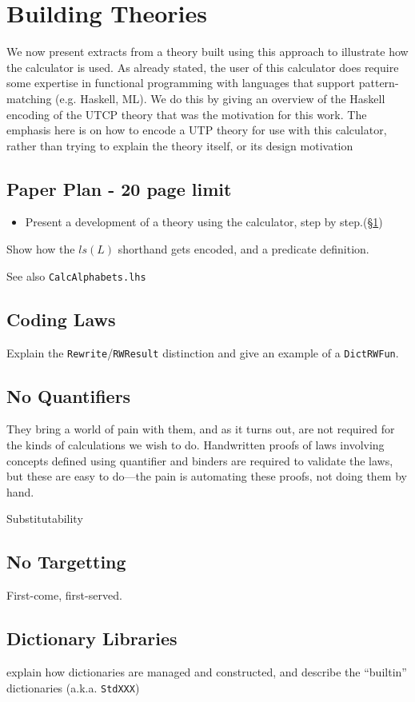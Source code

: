 \section{Building Theories}\label{sec:Theorising}


We now present extracts from a theory built using this
approach to illustrate how the calculator is used.
As already stated,
the user of this calculator does require some expertise
in functional programming with languages that support
pattern-matching (e.g. Haskell, ML).
We do this by giving an overview of the Haskell encoding
of the UTCP theory
that was the motivation for this work.
The emphasis here is on how to encode a UTP theory for use with this
calculator,
rather than trying to explain the theory itself, or its design motivation



\subsection*{Paper Plan - 20 page limit}

\begin{itemize}
  \item
     Present a development of a theory using the calculator,
     step by step.(\S\ref{sec:Theorising})
\end{itemize}

Show how the $ls(L)$ shorthand gets encoded,
and a predicate definition.

See also \texttt{CalcAlphabets.lhs}

\subsection{Coding Laws}\label{ssec:coding-laws}

Explain the \texttt{Rewrite}/\texttt{RWResult} distinction
and give an example of a \texttt{DictRWFun}.

\subsection{No Quantifiers}\label{ssec:no-quant}

    They bring a world of pain with them,
    and as it turns out, are not required
    for the kinds of calculations we wish to do.
    Handwritten proofs of laws involving concepts
    defined using quantifier and binders
    are required to validate the laws,
    but these are easy to do---the pain is automating these proofs,
    not doing them by hand.

    Substitutability

\subsection{No Targetting}\label{ssec:no-target}

First-come, first-served.

\subsection{Dictionary Libraries}

explain how dictionaries are managed and constructed,
and describe the ``builtin'' dictionaries (a.k.a. \texttt{StdXXX})
